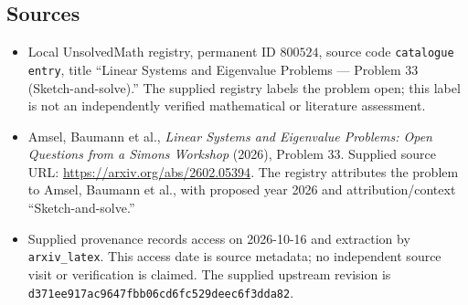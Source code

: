 \documentclass[11pt]{article}
\begin{document}
\subsection{Sources}
\begin{itemize}
\item Local UnsolvedMath registry, permanent ID \(800524\), source code \texttt{catalogue entry}, title ``Linear Systems and Eigenvalue Problems --- Problem 33 (Sketch-and-solve).'' The supplied registry labels the problem open; this label is not an independently verified mathematical or literature assessment.
\item Amsel, Baumann et al., \emph{Linear Systems and Eigenvalue Problems: Open Questions from a Simons Workshop} (2026), Problem 33. Supplied source URL: \url{https://arxiv.org/abs/2602.05394}. The registry attributes the problem to Amsel, Baumann et al., with proposed year 2026 and attribution/context ``Sketch-and-solve.''
\item Supplied provenance records access on 2026-10-16 and extraction by \texttt{arxiv\_latex}. This access date is source metadata; no independent source visit or verification is claimed. The supplied upstream revision is \texttt{d371ee917ac9647fbb06cd6fc529deec6f3dda82}.
\end{itemize}
\end{document}
